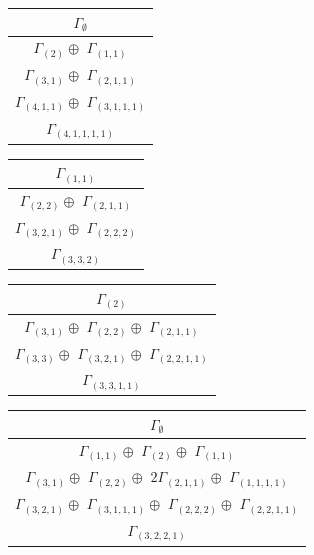 \documentclass[main.tex]{subfiles}
\begin{document}
\begin{minipage}{.25\textwidth}
\centering
\begin{tabular}{c}
$\Gamma_\emptyset$
\\ \hline
$\Gamma_{(
2
)} \oplus$
$\Gamma_{(
1 , 
1
)}$
\\ \hline
$\Gamma_{(
3 , 
1
)} \oplus$
$\Gamma_{(
2 , 
1 , 
1
)}$
\\ \hline
$\Gamma_{(
4 , 
1 , 
1
)} \oplus$
$\Gamma_{(
3 , 
1 , 
1 , 
1
)}$
\\ \hline
$\Gamma_{(
4 , 
1 , 
1 , 
1 , 
1
)}$
\\
\end{tabular}\end{minipage}
\bigskip
\begin{minipage}{.25\textwidth}
\centering
\begin{tabular}{c}
$\Gamma_{(
1 , 
1
)}$
\\ \hline
$\Gamma_{(
2 , 
2
)} \oplus$
$\Gamma_{(
2 , 
1 , 
1
)}$
\\ \hline
$\Gamma_{(
3 , 
2 , 
1
)} \oplus$
$\Gamma_{(
2 , 
2 , 
2
)}$
\\ \hline
$\Gamma_{(
3 , 
3 , 
2
)}$
\\
\end{tabular}\end{minipage}
\begin{minipage}{.3\textwidth}
\centering
\begin{tabular}{c}
$\Gamma_{(
2
)}$
\\ \hline
$\Gamma_{(
3 , 
1
)} \oplus$
$\Gamma_{(
2 , 
2
)} \oplus$
$\Gamma_{(
2 , 
1 , 
1
)}$
\\ \hline
$\Gamma_{(
3 , 
3
)} \oplus$
$\Gamma_{(
3 , 
2 , 
1
)} \oplus$
$\Gamma_{(
2 , 
2 , 
1 , 
1
)}$
\\ \hline
$\Gamma_{(
3 , 
3 , 
1 , 
1
)}$
\\
\end{tabular}\end{minipage}
\begin{minipage}{.5\textwidth}
\centering
\begin{tabular}{c}
$\Gamma_\emptyset$
\\ \hline
$\Gamma_{(
1 , 
1
)} \oplus$
$\Gamma_{(
2
)} \oplus$
$\Gamma_{(
1 , 
1
)}$
\\ \hline
$\Gamma_{(
3 , 
1
)} \oplus$
$\Gamma_{(
2 , 
2
)} \oplus$
$2\Gamma_{(
2 , 
1 , 
1
)} \oplus$
$\Gamma_{(
1 , 
1 , 
1 , 
1
)}$
\\ \hline
$\Gamma_{(
3 , 
2 , 
1
)} \oplus$
$\Gamma_{(
3 , 
1 , 
1 , 
1
)} \oplus$
$\Gamma_{(
2 , 
2 , 
2
)} \oplus$
$\Gamma_{(
2 , 
2 , 
1 , 
1
)}$
\\ \hline
$\Gamma_{(
3 , 
2 , 
2 , 
1
)}$
\\
\end{tabular}\end{minipage}
\end{document}
